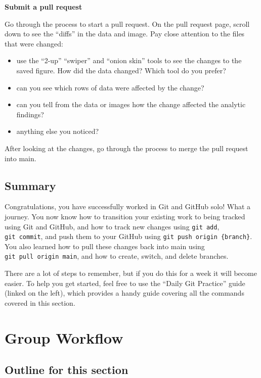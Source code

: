 \documentclass[
]{book}
\providecommand{\tightlist}{%
  \setlength{\itemsep}{0pt}\setlength{\parskip}{0pt}}
\begin{document}
\textbf{Submit a pull request}

Go through the process to start a pull request. On the pull request page,
scroll down to see the ``diffs'' in the data and image. Pay close attention to
the files that were changed:

\begin{itemize}
\tightlist
\item
  use the ``2-up'' ``swiper'' and ``onion skin'' tools to see the changes to the saved figure.
  How did the data changed? Which tool do you prefer?
\item
  can you see which rows of data were affected by the change?
\item
  can you tell from the data or images how the change affected the analytic findings?
\item
  anything else you noticed?
\end{itemize}

After looking at the changes, go through the process to merge the pull request
into main.

\section{Summary}\label{summary}

Congratulations, you have successfully worked in Git and GitHub solo! What a
journey. You now know how to transition your existing work to being tracked
using Git and GitHub, and how to track new changes using \texttt{git\ add}, \texttt{git\ commit},
and push them to your GitHub using \texttt{git\ push\ origin\ \{branch\}}. You also learned
how to pull these changes back into main using \texttt{git\ pull\ origin\ main}, and how to
create, switch, and delete branches.

There are a lot of steps to remember, but if you do this for a week it will
become easier. To help you get started, feel free to use the ``Daily Git Practice''
guide (linked on the left), which provides a handy guide covering all the
commands covered in this section.

\chapter{Group Workflow}\label{group-workflow}

\section{Outline for this section}\label{outline-for-this-section-1}
\end{document}
